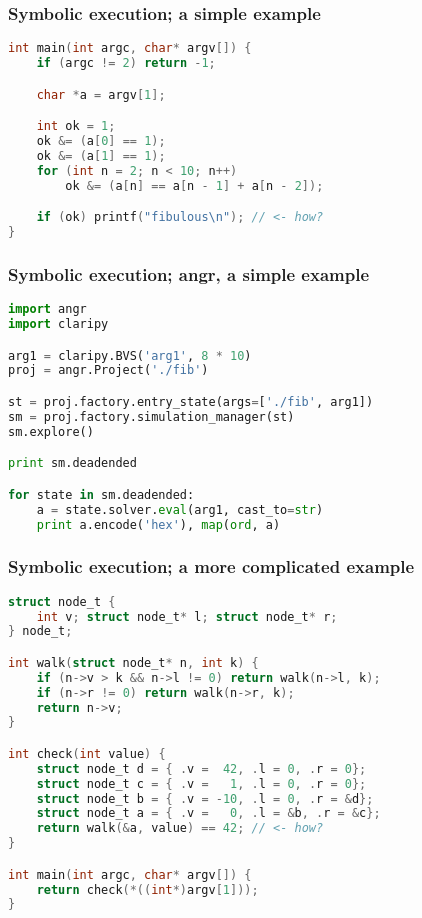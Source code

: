 \documentclass{beamer}
\begin{document}
\begin{frame}[fragile]
\frametitle{Symbolic execution; a simple example}
\begin{lstlisting}[language=C]
int main(int argc, char* argv[]) {
    if (argc != 2) return -1;

    char *a = argv[1];

    int ok = 1;
    ok &= (a[0] == 1);
    ok &= (a[1] == 1);
    for (int n = 2; n < 10; n++)
        ok &= (a[n] == a[n - 1] + a[n - 2]);

    if (ok) printf("fibulous\n"); // <- how?
}
\end{lstlisting}
\end{frame}

\begin{frame}[fragile]
\frametitle{Symbolic execution; angr, a simple example}
\begin{lstlisting}[language=python]
import angr
import claripy

arg1 = claripy.BVS('arg1', 8 * 10)
proj = angr.Project('./fib')

st = proj.factory.entry_state(args=['./fib', arg1])
sm = proj.factory.simulation_manager(st)
sm.explore()

print sm.deadended

for state in sm.deadended:
    a = state.solver.eval(arg1, cast_to=str)
    print a.encode('hex'), map(ord, a)
\end{lstlisting}
\end{frame}


\begin{frame}[fragile]
\frametitle{Symbolic execution; a more complicated example}
\begin{lstlisting}[language=C]
struct node_t {
    int v; struct node_t* l; struct node_t* r;
} node_t;

int walk(struct node_t* n, int k) {
    if (n->v > k && n->l != 0) return walk(n->l, k);
    if (n->r != 0) return walk(n->r, k);
    return n->v;
}

int check(int value) {
    struct node_t d = { .v =  42, .l = 0, .r = 0};
    struct node_t c = { .v =   1, .l = 0, .r = 0};
    struct node_t b = { .v = -10, .l = 0, .r = &d};
    struct node_t a = { .v =   0, .l = &b, .r = &c};
    return walk(&a, value) == 42; // <- how?
}

int main(int argc, char* argv[]) {
    return check(*((int*)argv[1]));
}
\end{lstlisting}
\end{frame}
\end{document}
